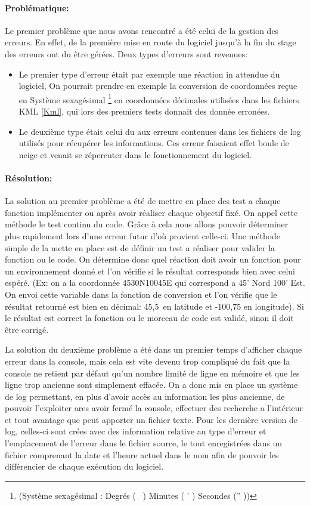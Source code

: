             \paragraph{Problématique:}
Le premier problème que nous avons rencontré a été celui de la gestion des erreurs. En effet, de la première mise en route du logiciel jusqu'à la fin du stage des erreurs ont du être gérées. Deux types d'erreurs sont revenues:
\begin{itemize}
    \item Le premier type d'erreur était par exemple une réaction in attendue du logiciel, On pourrait prendre en exemple la conversion de coordonnées reçue en Système sexagésimal \footnote{(Système sexagésimal : Degrés ( \degres\ ) Minutes ( ' ) Secondes ('' ))} en coordonnées décimales utilisées dans les fichiers KML \vref{Kml}, qui lors des premiers tests donnait des donnée erronées.
    \item Le deuxième type était celui du aux erreurs contenues dans les fichiers de log utilisés pour récupérer les informations. Ces erreur faisaient effet boule de neige et venait se répercuter dans le fonctionnement du logiciel.
\end{itemize}\medskip

            \paragraph{Résolution:}
La solution au premier problème a été de mettre en place des test a chaque fonction implémenter ou après avoir réaliser chaque objectif fixé. On appel cette méthode le test continu du code. Grâce à cela nous allons pouvoir déterminer plus rapidement lors d'une erreur futur d'où provient celle-ci. Une méthode simple de la mette en place est de définir un test a réaliser pour valider la fonction ou le code. On détermine donc quel réaction doit avoir un fonction pour un environnement donné et l'on vérifie si le résultat corresponds bien avec celui espéré. (Ex: on a la coordonnée 4530N10045E qui correspond a 45' Nord 100' Est. On envoi cette variable dans la fonction de conversion et l'on vérifie que le résultat retourné est bien en décimal: 45,5\degres\ en latitude et -100,75 en longitude). Si le résultat est correct la fonction ou le morceau de code est validé, sinon il doit être corrigé.

La solution du deuxième problème a été dans un premier temps d'afficher chaque erreur dans la console, mais cela est vite devenu trop compliqué du fait que la console ne retient par défaut qu'un nombre limité de ligne en mémoire et que les ligne trop ancienne sont simplement effacée. On a donc mis en place un système de log permettant, en plus d'avoir accès au information les plus ancienne, de pouvoir l'exploiter ares avoir fermé la console, effectuer des recherche a l'intérieur et tout avantage que peut apporter un fichier texte. Pour les dernière version de log, celles-ci sont crées avec des information relative au type d'erreur et l'emplacement de l'erreur dans le fichier source, le tout enregistrées dans un fichier comprenant la date et l'heure actuel dans le nom afin de pouvoir les différencier de chaque exécution du logiciel. 

